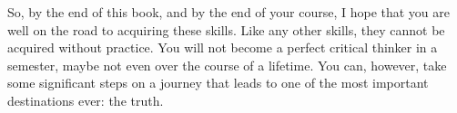 So, by the end of this book, and by the end of your course, I hope that
you are well on the road to acquiring these skills. Like any other
skills, they cannot be acquired without practice. You will not become a
perfect critical thinker in a semester, maybe not even over the course
of a lifetime. You can, however, take some significant steps on a
journey that leads to one of the most important destinations ever: the
truth.


